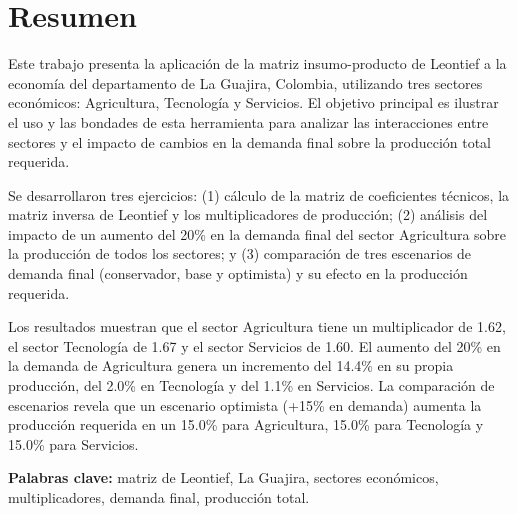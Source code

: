 \section*{Resumen}

Este trabajo presenta la aplicación de la matriz insumo-producto de Leontief a la economía del departamento de La Guajira, Colombia, utilizando tres sectores económicos: Agricultura, Tecnología y Servicios. El objetivo principal es ilustrar el uso y las bondades de esta herramienta para analizar las interacciones entre sectores y el impacto de cambios en la demanda final sobre la producción total requerida.

Se desarrollaron tres ejercicios: (1) cálculo de la matriz de coeficientes técnicos, la matriz inversa de Leontief y los multiplicadores de producción; (2) análisis del impacto de un aumento del 20\% en la demanda final del sector Agricultura sobre la producción de todos los sectores; y (3) comparación de tres escenarios de demanda final (conservador, base y optimista) y su efecto en la producción requerida.

Los resultados muestran que el sector Agricultura tiene un multiplicador de 1.62, el sector Tecnología de 1.67 y el sector Servicios de 1.60. El aumento del 20\% en la demanda de Agricultura genera un incremento del 14.4\% en su propia producción, del 2.0\% en Tecnología y del 1.1\% en Servicios. La comparación de escenarios revela que un escenario optimista (+15\% en demanda) aumenta la producción requerida en un 15.0\% para Agricultura, 15.0\% para Tecnología y 15.0\% para Servicios.

\textbf{Palabras clave:} matriz de Leontief, La Guajira, sectores económicos, multiplicadores, demanda final, producción total.

\clearpage
